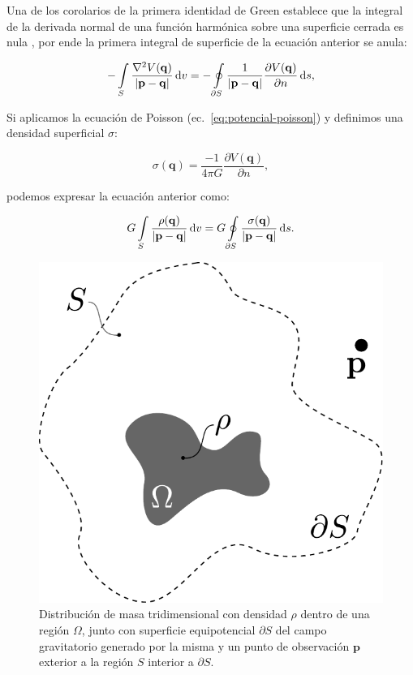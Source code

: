 Una de los corolarios de la primera identidad de Green establece que la
integral de la derivada normal de una función harmónica  sobre una superficie
cerrada es nula \citep[][p.~20]{blakely1995}, por ende la primera integral de
superficie de la ecuación anterior se anula:

\begin{equation}
    - \int\limits_S
        \frac{\nabla^2 V(\mathbf{q})}{|\mathbf{p} - \mathbf{q}|}
    \mathop{}\!\textnormal{d} v
    =
    - \oint\limits_{\partial S}
        \frac{1}{|\mathbf{p} - \mathbf{q}|}
        \frac{\partial V(\mathbf{q})}{\partial n}
    \mathop{}\!\textnormal{d} s,
\end{equation}

Si aplicamos la ecuación de Poisson (ec.~\ref{eq:potencial-poisson})
y definimos una densidad superficial $\sigma$:

\begin{equation}
    \sigma(\mathbf{q}) =
    \frac{-1}{4\pi G} \frac{\partial V(\mathbf{q})}{\partial n},
\end{equation}

\noindent podemos expresar la ecuación anterior como:

\begin{equation}
    G \int\limits_S
        \frac{\rho(\mathbf{q})}{|\mathbf{p} - \mathbf{q}|}
    \mathop{}\!\textnormal{d} v
    =
    G \oint\limits_{\partial S}
        \frac{\sigma(\mathbf{q})}{|\mathbf{p} - \mathbf{q}|}
    \mathop{}\!\textnormal{d} s.
\end{equation}

\begin{figure}
    \centering
    \includegraphics[width=0.4\linewidth]{figs/fuentes-equivalentes.pdf}
    \caption{
        Distribución de masa tridimensional con densidad $\rho$ dentro de una
        región $\Omega$, junto con superficie equipotencial $\partial S$ del
        campo gravitatorio generado por la misma y un punto de observación
        $\mathbf{p}$ exterior a la región $S$ interior a $\partial S$.
    }
    \label{fig:fuentes-equivalentes}
\end{figure}

